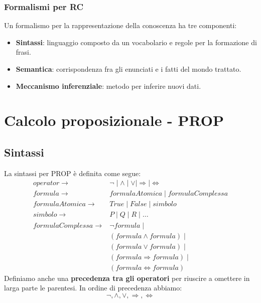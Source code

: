 \subsubsection{Formalismi per RC}
Un formalismo per la rappresentazione della conoscenza ha tre componenti:
\begin{itemize}
	\item \textbf{Sintassi}: linguaggio composto da un vocabolario e regole per la formazione di frasi.
	\item \textbf{Semantica}: corrispondenza fra gli enunciati e i fatti del mondo trattato.
	\item \textbf{Meccanismo inferenziale}: metodo per inferire nuovi dati.
\end{itemize}

\section{Calcolo proposizionale - PROP}
\subsection{Sintassi}
La sintassi per PROP \`e definita come segue:
\[
	\begin{array}{rl}
		operator \rightarrow         & \lnot \mid \wedge \mid \vee \mid \Rightarrow \mid \Leftrightarrow \\
		formula \rightarrow          & formulaAtomica \mid formulaComplessa                              \\
		formulaAtomica \rightarrow   & True \mid False \mid simbolo                                      \\
		simbolo \rightarrow          & P \mid Q \mid R \mid \dots                                        \\
		formulaComplessa \rightarrow & \lnot formula \mid                                                \\
		                             & (formula \wedge formula) \mid                                     \\
		                             & (formula \vee formula) \mid                                       \\
		                             & (formula \Rightarrow formula) \mid                                \\
		                             & (formula \Leftrightarrow formula)
	\end{array}
\]
Definiamo anche una \textbf{precedenza tra gli operatori} per riuscire a omettere in larga parte le
parentesi. In ordine di precedenza abbiamo:
\[ \lnot, \wedge, \vee, \Rightarrow, \Leftrightarrow \]

